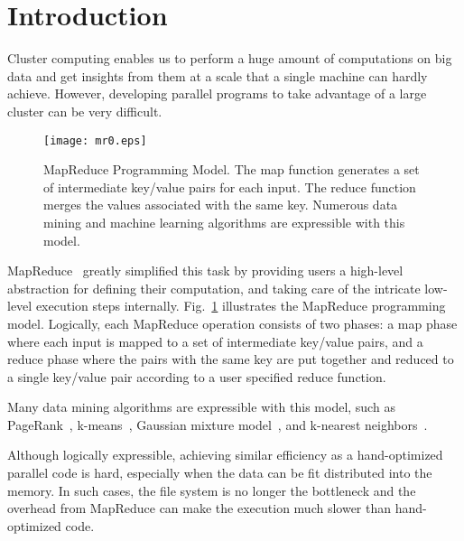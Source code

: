 \section{Introduction}

Cluster computing enables us to perform a huge amount of computations on big data and get insights from them at a scale that a single machine can hardly achieve.
However, developing parallel programs to take advantage of a large cluster can be very difficult.

\begin{figure}
  \begin{center}
  \texttt{[image: mr0.eps]}
  \end{center}
  \vspace{-0.2cm}
  \caption{MapReduce Programming Model.
  The map function generates a set of intermediate key/value pairs for each input.
  The reduce function merges the values associated with the same key.
  Numerous data mining and machine learning algorithms are expressible with this model.
  }
  \label{fig:mr}
\end{figure}

MapReduce~\cite{dean2008mapreduce,dean2010mapreduce} greatly simplified this task by providing users a high-level abstraction for defining their computation, and taking care of the intricate low-level execution steps internally.
Fig.~\ref{fig:mr} illustrates the MapReduce programming model.
Logically, each MapReduce operation consists of two phases: a map phase where each input is mapped to a set of intermediate key/value pairs, and a reduce phase where the pairs with the same key are put together and reduced to a single key/value pair according to a user specified reduce function.


Many data mining algorithms are expressible with this model, such as PageRank~\cite{bahmani2011fast,plimpton2011mapreduce,ekanayake2010twister}, k-means~\cite{zhao2009parallel,chu2007map,cui2014optimized,anchalia2013mapreduce,ekanayake2008mapreduce,gopalani2015comparing}, Gaussian mixture model~\cite{chu2007map}, and k-nearest neighbors~\cite{anchalia2014k,maillo2015mapreduce,lu2012efficient,yokoyama2012processing}.

Although logically expressible, achieving similar efficiency as a hand-optimized parallel code is hard, especially when the data can be fit distributed into the memory.
In such cases, the file system is no longer the bottleneck and the overhead from MapReduce can make the execution much slower than hand-optimized code.

